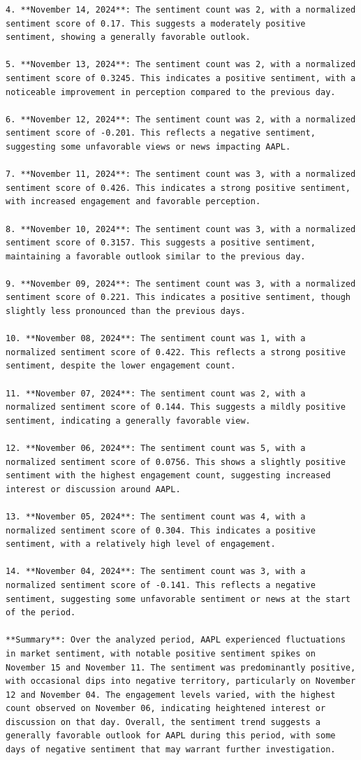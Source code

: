\begin{tcolorbox}
\begin{lstlisting}[style=agentbase]
4. **November 14, 2024**: The sentiment count was 2, with a normalized sentiment score of 0.17. This suggests a moderately positive sentiment, showing a generally favorable outlook.

5. **November 13, 2024**: The sentiment count was 2, with a normalized sentiment score of 0.3245. This indicates a positive sentiment, with a noticeable improvement in perception compared to the previous day.

6. **November 12, 2024**: The sentiment count was 2, with a normalized sentiment score of -0.201. This reflects a negative sentiment, suggesting some unfavorable views or news impacting AAPL.

7. **November 11, 2024**: The sentiment count was 3, with a normalized sentiment score of 0.426. This indicates a strong positive sentiment, with increased engagement and favorable perception.

8. **November 10, 2024**: The sentiment count was 3, with a normalized sentiment score of 0.3157. This suggests a positive sentiment, maintaining a favorable outlook similar to the previous day.

9. **November 09, 2024**: The sentiment count was 3, with a normalized sentiment score of 0.221. This indicates a positive sentiment, though slightly less pronounced than the previous days.

10. **November 08, 2024**: The sentiment count was 1, with a normalized sentiment score of 0.422. This reflects a strong positive sentiment, despite the lower engagement count.

11. **November 07, 2024**: The sentiment count was 2, with a normalized sentiment score of 0.144. This suggests a mildly positive sentiment, indicating a generally favorable view.

12. **November 06, 2024**: The sentiment count was 5, with a normalized sentiment score of 0.0756. This shows a slightly positive sentiment with the highest engagement count, suggesting increased interest or discussion around AAPL.

13. **November 05, 2024**: The sentiment count was 4, with a normalized sentiment score of 0.304. This indicates a positive sentiment, with a relatively high level of engagement.

14. **November 04, 2024**: The sentiment count was 3, with a normalized sentiment score of -0.141. This reflects a negative sentiment, suggesting some unfavorable sentiment or news at the start of the period.

**Summary**: Over the analyzed period, AAPL experienced fluctuations in market sentiment, with notable positive sentiment spikes on November 15 and November 11. The sentiment was predominantly positive, with occasional dips into negative territory, particularly on November 12 and November 04. The engagement levels varied, with the highest count observed on November 06, indicating heightened interest or discussion on that day. Overall, the sentiment trend suggests a generally favorable outlook for AAPL during this period, with some days of negative sentiment that may warrant further investigation.
\end{lstlisting}
\end{tcolorbox}

